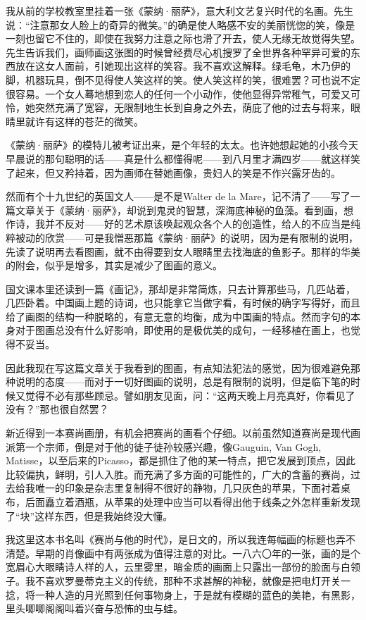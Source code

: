 \par 我从前的学校教室里挂着一张《蒙纳·丽萨》，意大利文艺复兴时代的名画。先生说：“注意那女人脸上的奇异的微笑。”的确是使人略感不安的美丽恍惚的笑，像是一刻也留它不住的，即使在我努力注意之际也滑了开去，使人无缘无故觉得失望。先生告诉我们，画师画这张图的时候曾经费尽心机搜罗了全世界各种罕异可爱的东西放在这女人面前，引她现出这样的笑容。我不喜欢这解释。绿毛龟，木乃伊的脚，机器玩具，倒不见得使人笑这样的笑。使人笑这样的笑，很难罢？可也说不定很容易。一个女人蓦地想到恋人的任何一个小动作，使他显得异常稚气，可爱又可怜，她突然充满了宽容，无限制地生长到自身之外去，荫庇了他的过去与将来，眼睛里就许有这样的苍茫的微笑。
\par 《蒙纳·丽萨》的模特儿被考证出来，是个年轻的太太。也许她想起她的小孩今天早晨说的那句聪明的话——真是什么都懂得呢——到八月里才满四岁——就这样笑了起来，但又矜持着，因为画师在替她画像，贵妇人的笑是不作兴露牙齿的。
\par 然而有个十九世纪的英国文人——是不是Walter de la Mare，记不清了——写了一篇文章关于《蒙纳·丽萨》，却说到鬼灵的智慧，深海底神秘的鱼藻。看到画，想作诗，我并不反对——好的艺术原该唤起观众各个人的创造性，给人的不应当是纯粹被动的欣赏——可是我憎恶那篇《蒙纳·丽萨》的说明，因为是有限制的说明，先读了说明再去看图画，就不由得要到女人眼睛里去找海底的鱼影子。那样的华美的附会，似乎是增多，其实是减少了图画的意义。
\par 国文课本里还读到一篇《画记》，那却是非常简炼，只去计算那些马，几匹站着，几匹卧着。中国画上题的诗词，也只能拿它当做字看，有时候的确字写得好，而且给了画图的结构一种脱略的，有意无意的均衡，成为中国画的特点。然而字句的本身对于图画总没有什么好影响，即使用的是极优美的成句，一经移植在画上，也觉得不妥当。
\par 因此我现在写这篇文章关于我看到的图画，有点知法犯法的感觉，因为很难避免那种说明的态度——而对于一切好图画的说明，总是有限制的说明，但是临下笔的时候又觉得不必有那些顾忌。譬如朋友见面，问：“这两天晚上月亮真好，你看见了没有？”那也很自然罢？
\par 新近得到一本赛尚画册，有机会把赛尚的画看个仔细。以前虽然知道赛尚是现代画派第一个宗师，倒是对于他的徒子徒孙较感兴趣，像Gauguin, Van Gogh, Matisse，以至后来的Picasso，都是抓住了他的某一特点，把它发展到顶点，因此比较偏执，鲜明，引人入胜。而充满了多方面的可能性的，广大的含蓄的赛尚，过去给我唯一的印象是杂志里复制得不很好的静物，几只灰色的苹果，下面衬着桌布，后面矗立着酒瓶，从苹果的处理中应当可以看得出他于线条之外怎样重新发现了“块”这样东西，但是我始终没大懂。
\par 我这里这本书名叫《赛尚与他的时代》，是日文的，所以我连每幅画的标题也弄不清楚。早期的肖像画中有两张成为值得注意的对比。一八六〇年的一张，画的是个宽眉心大眼睛诗人样的人，云里雾里，暗金质的画面上只露出一部份的脸面与白领子。我不喜欢罗曼蒂克主义的传统，那种不求甚解的神秘，就像是把电灯开关一捻，将一种人造的月光照到任何事物身上，于是就有模糊的蓝色的美艳，有黑影，里头唧唧阁阁叫着兴奋与恐怖的虫与蛙。
